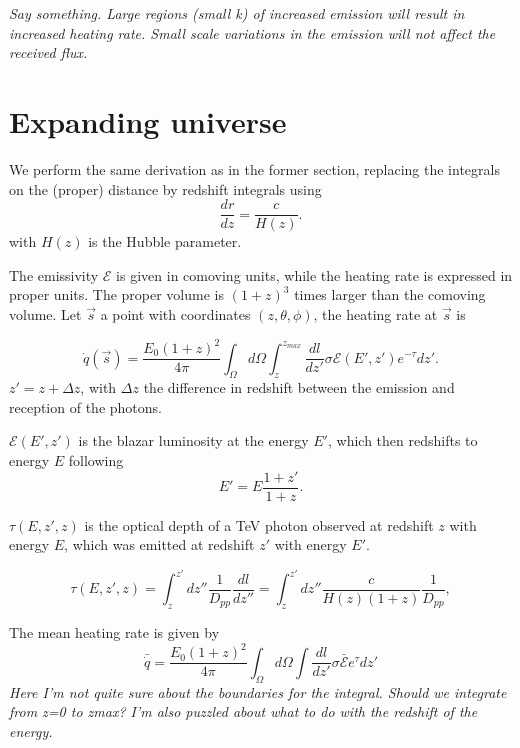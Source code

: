\documentclass[twocolumns]{emulateapj}
\begin{document}
\textit{Say something. Large regions (small k) of increased emission will result in increased heating rate.  Small scale variations in the emission will not affect the received flux.} 


\section{Expanding universe}\label{sec:window_exp}

We perform the same derivation as in the former section, replacing the integrals on the (proper) distance by redshift integrals using
\begin{equation}
  \label{eq:proper_dist}
  \frac{dr}{dz}=\frac{c}{H(z)}.
\end{equation}
with  $H(z)$ is the Hubble parameter.

 The emissivity $\mathcal{E}$ is given in comoving units, while the heating rate  is expressed in proper units. The proper volume is  $(1+z)^3$ times larger than the comoving volume. 
Let $\vec{s}$ a point with coordinates $(z,\theta,\phi)$, the heating rate at $\vec{s}$ is 

\begin{equation}
  \label{eq:int_exp_heat}
  \dot{q}(\vec{s})=\frac{E_0(1+z)^2}{4\pi}\int_{\Omega}d\Omega\int_z^{z_{max}}\frac{dl}{dz'}\sigma\mathcal{E}(E',z') e^{-\tau} dz'.
\end{equation}
 $z'=z+\Delta z$, with $\Delta z$ the difference in redshift between the emission and reception of the photons.

$\mathcal{E}(E',z')$ is  the   blazar luminosity at the energy $E'$,  which then redshifts to energy $E$ following 
\begin{equation}
  \label{eq:E_z}
  E'=E\frac{1+z'}{1+z}.
\end{equation}

$\tau(E,z',z)$ is the optical depth of a TeV photon observed at redshift $z$ with energy $E$, which was emitted at redshift $z'$ with energy $E'$.

\begin{equation}
  \label{eq:tau}
  \tau(E,z',z)=\int_z^{z'}dz''\frac{1}{D_{pp}}\frac{dl}{dz''}=\int_z^{z'}dz''\frac{c}{H(z)(1+z)}\frac{1}{D_{pp}},
\end{equation}



The mean heating rate is given by 
\begin{equation}
  \label{eq:mean_exp_heat}
  \bar{\dot{q}}=\frac{E_0(1+z)^2}{4\pi}\int_{\Omega}d\Omega\int \frac{dl}{dz'}\sigma\bar{\mathcal{E}} e^{\tau}dz'
\end{equation}
\textit{Here I'm not quite sure about the boundaries for the integral. Should we integrate from z=0 to zmax? I'm also puzzled about what to do with the redshift of the energy.}
\end{document}

